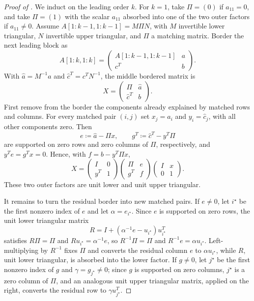 \documentclass[preprint,12pt]{elsarticle}
\theoremstyle{plain}
\theoremstyle{nonumberplain}
\newtheorem{proof}{Proof}
\numberwithin{equation}{section}
\numberwithin{theorem}{section}
\begin{document}
\begin{proof}[Proof of ]
  We induct on the leading order $k$.  For $k=1$, take $\Pi=(0)$ if
  $a_{11}=0$, and take $\Pi=(1)$ with the scalar $a_{11}$ absorbed into one of
  the two outer factors if $a_{11}\ne0$.  Assume
  $A[1:k-1,1:k-1]=M\Pi N$, with $M$ invertible lower triangular, $N$ invertible
  upper triangular, and $\Pi$ a matching matrix.  Border the next leading block as
  \[
    A[1:k,1:k]=
    \begin{pmatrix}
      A[1:k-1,1:k-1] & a\\
      c^T & b
    \end{pmatrix}.
  \]
  With $\widehat a=M^{-1}a$ and $\widehat c^T=c^TN^{-1}$, the middle bordered
  matrix is
  \[
    X=
    \begin{pmatrix}
      \Pi & \widehat a\\
      \widehat c^T & b
    \end{pmatrix}.
  \]
  First remove from the border the components already explained by matched
  rows and columns.  For every matched pair $(i,j)$ set
  $x_j=\widehat a_i$ and $y_i=\widehat c_j$, with all other components zero.
  Then
  \[
    e\coloneq\widehat a-\Pi x,
    \qquad
    g^T\coloneq\widehat c^T-y^T\Pi
  \]
  are supported on zero rows and zero columns of $\Pi$, respectively, and
  $y^Te=g^Tx=0$.  Hence, with $f=b-y^T\Pi x$,
  \[
    X=
    \begin{pmatrix}I&0\\y^T&1
    \end{pmatrix}
    \begin{pmatrix}\Pi&e\\g^T&f
    \end{pmatrix}
    \begin{pmatrix}I&x\\0&1
    \end{pmatrix}.
  \]
  These two outer factors are unit lower and unit upper triangular.

  It remains to turn the residual border into new matched pairs.  If $e\ne0$,
  let $i^\star$ be the first nonzero index of $e$ and let
  $\alpha=e_{i^\star}$.  Since $e$ is supported on zero rows, the unit lower
  triangular matrix
  \[
    R=I+(\alpha^{-1}e-u_{i^\star})u_{i^\star}^T
  \]
  satisfies $R\Pi=\Pi$ and $Ru_{i^\star}=\alpha^{-1}e$, so
  $R^{-1}\Pi=\Pi$ and $R^{-1}e=\alpha u_{i^\star}$.  Left-multiplying by $R^{-1}$ fixes $\Pi$ and
  converts the residual column $e$ to $\alpha u_{i^\star}$, while
  $R$, unit lower triangular, is absorbed into the lower factor.  If $g\ne0$,
  let $j^\star$ be the first nonzero index of $g$ and $\gamma=g_{j^\star}\ne0$;
  since $g$ is supported on zero columns, $j^\star$ is a zero column of $\Pi$,
  and an analogous unit upper triangular matrix, applied on the right,
  converts the residual row to $\gamma u_{j^\star}^T$.


\end{proof}
\end{document}

